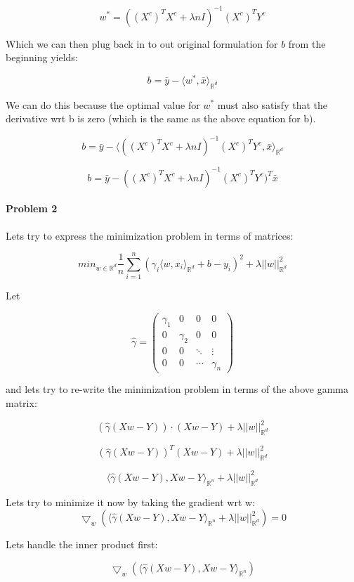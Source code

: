 \documentclass[12pt]{report}
\begin{document}
$$w^* = ((X^c)^TX^c + \lambda n I)^{-1}(X^c)^TY^c$$

Which we can then plug back in to out original formulation for $b$ from the beginning yields:

$$b= \bar{y} -\langle w^*, \bar{x} \rangle_{\mathbb{R}^d}$$

We can do this because the optimal value for $w^*$ must also satisfy that the derivative wrt b is zero (which is the same as the above equation for b).

$$b= \bar{y} -\langle ((X^c)^TX^c + \lambda n I)^{-1}(X^c)^TY^c, \bar{x} \rangle_{\mathbb{R}^d}$$

$$b= \bar{y} -((X^c)^TX^c + \lambda n I)^{-1}(X^c)^TY^c)^T \bar{x}$$

\paragraph{Problem 2}

Lets try to express the minimization problem in terms of matrices:

$$min_{w \in \mathbb{R}^d} \frac{1}{n} \sum_{i=1}^{n}( \gamma_i \langle w, x_i\rangle_{\mathbb{R}^d} +b - y_i)^2 + \lambda ||w||_{\mathbb{R}^d}^2$$

Let 

\[ \hat{\gamma} = \left( \begin{array}{cccc}
\gamma_1 & 0 & 0 & 0 \\
0 & \gamma_2 & 0 & 0 \\
0 & 0 & \ddots & \vdots \\
0 & 0 & \cdots & \gamma_n \end{array} \right)\] 

and lets try to re-write the minimization problem in terms of the above gamma matrix:

$$(\hat{\gamma} (Xw - Y)) \cdot (Xw - Y) + \lambda||w||_{\mathbb{R}^d}^2$$

$$(\hat{\gamma} (Xw - Y))^T (Xw - Y) + \lambda||w||_{\mathbb{R}^d}^2$$

$$\langle \hat{\gamma} (Xw - Y), Xw - Y\rangle_{\mathbb{R}^n} + \lambda||w||_{\mathbb{R}^d}^2$$

Lets try to minimize it now by taking the gradient wrt w:
$$ \bigtriangledown_w  \left( \langle \hat{\gamma} (Xw - Y), Xw - Y\rangle_{\mathbb{R}^n} + \lambda||w||_{\mathbb{R}^d}^2 \right) = 0$$

Lets handle the inner product first:

$$ \bigtriangledown_w  \left( \langle \hat{\gamma} (Xw - Y), Xw - Y\rangle_{\mathbb{R}^n} \right)$$
\end{document}
